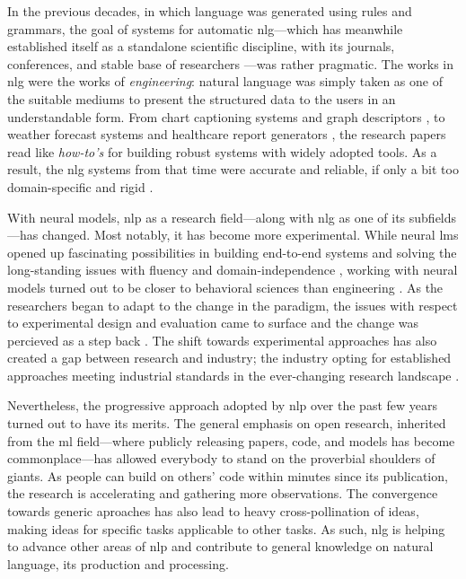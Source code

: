 In the previous decades, in which language was generated using rules and grammars, the goal of systems for automatic \ac{nlg}---which has meanwhile established itself as a standalone scientific discipline, with its journals, conferences, and stable base of researchers \cite{ACLanthologySIGGEN}---was rather pragmatic.
The works in \ac{nlg} were the works of \emph{engineering}: natural language was simply taken as one of the suitable mediums to present the structured data to the users in an understandable form. From chart captioning systems \cite{mittalDescribingComplexCharts1998} and graph descriptors \cite{sunDomainIndependentSentence2006}, to weather forecast systems \cite{belzAutomaticGenerationWeather2008} and healthcare report generators \cite{portetAutomaticGenerationTextual2009}, the research papers read like \emph{how-to's} for building robust systems with widely adopted tools. As a result, the \ac{nlg} systems from that time were accurate and reliable, if only a bit too domain-specific and rigid \cite{reiterBuildingAppliedNatural1997,gattSurveyStateArt2018}.


With neural models, \ac{nlp} as a research field---along with \ac{nlg} as one of its subfields---has changed. Most notably, it has become more experimental. While neural \acp{lm} opened up fascinating possibilities in building end-to-end systems and solving the long-standing issues with fluency and domain-independence \cite{ferreiraNeuralDatatotextGeneration2019,dusekEvaluatingStateoftheartEndtoEnd2020,sharmaInnovationsNeuralDatatotext2022}, working with neural models turned out to be closer to behavioral sciences than engineering \cite{holtzmanGenerativeModelsComplex2023}. As the researchers began to adapt to the change in the paradigm, the issues with respect to experimental design and evaluation came to surface \cite{gehrmannRepairingCrackedFoundation2022} and the change was percieved as a step back \cite{reiter2020academic}. The shift towards experimental approaches has also created a gap between research and industry; the industry opting for established approaches meeting industrial standards in the ever-changing research landscape
% 
\cite{daleNaturalLanguageGeneration2020,daleNavigatingTextGeneration2023}.


Nevertheless, the progressive approach adopted by \ac{nlp} over the past few years turned out to have its merits. The general emphasis on open research, inherited from the \ac{ml} field---where publicly releasing papers, code, and models has become commonplace---has allowed everybody to stand on the proverbial shoulders of giants. As people can build on others' code within minutes since its publication, the research is accelerating and gathering more observations. The convergence towards generic aproaches has also lead to heavy cross-pollination of ideas, making ideas for specific tasks applicable to other tasks. As such, \ac{nlg} is helping to advance other areas of \ac{nlp} and contribute to general knowledge on natural language, its production and processing.

